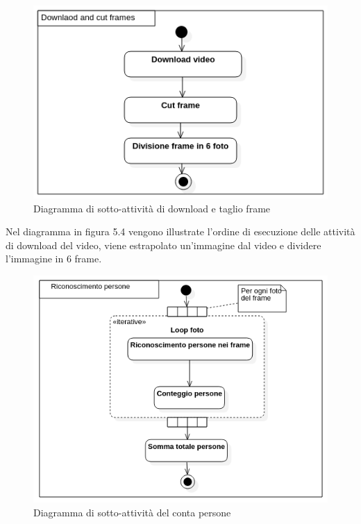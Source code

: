 \begin{figure}[H]
  \begin{center}
    \includegraphics[scale=0.65]{../immagini/diag_PB/download_e_cut_frames.png}
    \caption{Diagramma di sotto-attività di download e taglio frame}
  \end{center}
\end{figure}
Nel diagramma in figura 5.4 vengono illustrate l'ordine di esecuzione delle attività di download del video, viene estrapolato un'immagine dal video e dividere l'immagine in 6 frame.
\begin{figure}[H]
  \begin{center}
    \includegraphics[scale=0.7]{../immagini/diag_PB/conta_persone.png}
    \caption{Diagramma di sotto-attività del conta persone}
  \end{center}
\end{figure}
